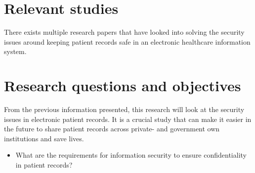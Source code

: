 \documentclass[11pt, a4paper]{article}
\begin{document}
\section{Relevant studies}

There exists multiple research papers that have looked into solving the security issues around keeping patient records safe in an electronic healthcare information system. 

\section{Research questions and objectives}

From the previous information presented, this research will look at the security issues in electronic patient records. It is a crucial study that can make it easier in the future to share patient records across private- and government own institutions and save lives. 

\begin{itemize}
\item What are the requirements for information security to ensure confidentiality in patient records?
\end{itemize}


\end{document}
